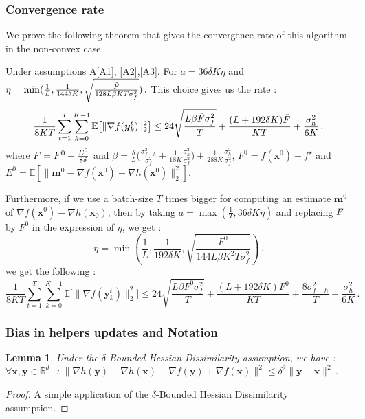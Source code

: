 \documentclass[10pt]{article} %
\theoremstyle{plain}
\newtheorem{lemma}[theorem]{Lemma}
\theoremstyle{definition}
\theoremstyle{remark}
\newcommand{\norm}[1]{\|#1\|_2}
\def\vm{{\bm{m}}}
\def\vx{{\bm{x}}}
\def\vy{{\bm{y}}}
\newcommand{\E}{\mathbb{E}}
\newcommand{\R}{\mathbb{R}}
\begin{document}
\subsubsection{Convergence rate}
We prove the following theorem that gives the convergence rate of this algorithm in the non-convex case.
\newpage
\begin{framedtheorem}
Under assumptions A\ref{A1}, \ref{A2},\ref{A3}. For $a = 36 \delta K\eta$ and 
$\eta = \min(\frac{1}{L},\frac{1}{144\delta K}, \sqrt{\frac{\Tilde{F}}{128L\beta KT\sigma_f^2}})\, .$
This choice gives us the rate :
$$\frac{1}{8KT}\sum_{t=1}^T\sum_{k=0}^{K-1} \E\big[\norm{\nabla f(\vy^t_k)}^2\big] \leq 24 \sqrt{\frac{L\beta\Tilde{F}\sigma_f^2}{T}} + \frac{(L + 192 \delta K)\Tilde{F}}{KT}+ \frac{\sigma_h^2}{6K}\, .$$
where $\Tilde{F} = F^{0} + \frac{E^0}{8 \delta}$ and $\beta = \frac{\delta}{L}\bigg(\frac{\sigma_{f-h}^2}{\sigma_f^2} + \frac{1}{18K}\frac{\sigma_h^2}{\sigma_f^2}\bigg) + \frac{1}{288K}\frac{\sigma_h^2}{\sigma_f^2}$, $F^0 = f(\vx^0) - f^\star$ and $E^0 = \E[\norm{\vm^0 - \nabla f(\vx^0) + \nabla h(\vx^0)}^2]$.

Furthermore, if we use a batch-size  $T$ times bigger for computing an estimate $\vm^0$ of $\nabla f(\vx^0) - \nabla h(\vx_0)$, then by taking $a = \max(\frac{1}{T},36\delta K\eta)$ and replacing $\Tilde{F}$ by $F^0$ in the expression of $\eta$, we get :
$$\eta = \min(\frac{1}{L},\frac{1}{192\delta K}, \sqrt{\frac{F^0}{144L\beta K^2T\sigma_f^2}})\, .$$
we get the following :
$$\frac{1}{8KT}\sum_{t=1}^T\sum_{k=0}^{K-1} \E\big[\norm{\nabla f(\vy^t_k)}^2\big] \leq 24 \sqrt{\frac{L\beta F^0\sigma_f^2}{T}} + \frac{(L + 192 \delta K)F^0}{KT} + \frac{8\sigma_{f-h}^2}{T} + \frac{\sigma_h^2}{6K}\, .$$
\end{framedtheorem}

\subsubsection{Bias in helpers updates and Notation}
\begin{lemma} Under the $\delta$-Bounded Hessian Dissimilarity assumption, we have :\\ 
$\forall \vx, \vy \in \R^d \; $ : $\|\nabla h(\vy) - \nabla h(\vx) - \nabla f(\vy) + \nabla f(\vx)\|^2 \leq \delta^2 \|\vy - \vx\|^2\, .$
\end{lemma}
\begin{proof}
A simple application of the $\delta$-Bounded Hessian Dissimilarity assumption.
\end{proof}
\end{document}

